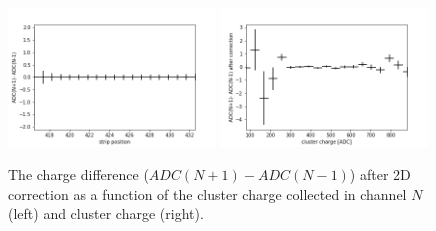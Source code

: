 \begin{figure}[h]
\begin{center}
\includegraphics[width = 0.49\textwidth]{figures/eta/difference_ac.png} 
\includegraphics[width = 0.49\textwidth]{figures/eta/difference_vs_charge_ac.png}
\caption{The charge difference ($ADC(N+1) - ADC(N-1)$) after 2D correction as a function of the cluster charge collected in channel $N$ (left) and cluster charge (right). }
\label{fig:after_correction}
 \end{center}
 \end{figure}


